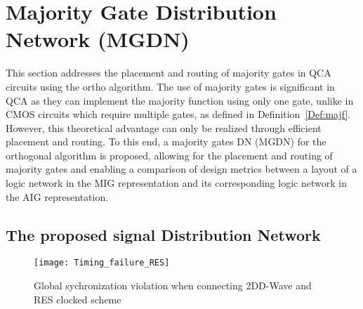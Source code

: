 \section{Majority Gate Distribution Network (MGDN)}\label{sec:majgatedisnet}
This section addresses the placement and routing of majority gates in QCA circuits using the ortho algorithm. The use of majority gates is significant in QCA as they can implement the majority function using only one gate, unlike in CMOS circuits which require multiple gates, as defined in Definition~\ref{Def:majf}. However, this theoretical advantage can only be realized through efficient placement and routing. To this end, a majority gates DN (MGDN) for the orthogonal algorithm is proposed, allowing for the placement and routing of majority gates and enabling a comparison of design metrics between a layout of a logic network in the MIG representation and its corresponding logic network in the AIG representation.

\subsection{The proposed signal Distribution Network}

\begin{figure}
	\centering
	\texttt{[image: Timing\_failure\_RES]}
	\caption{Global sychronization violation when connecting 2DD-Wave and RES clocked scheme}\label{fig:Timing_failure_RES}
\end{figure}

